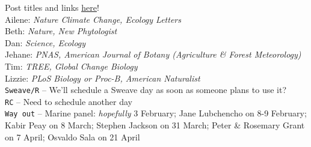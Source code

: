 \documentclass[11pt]{article}
\newenvironment{smitemize}{
\begin{itemize}
  \setlength{\itemsep}{0pt}
  \setlength{\parskip}{0.8pt}
  \setlength{\parsep}{0pt}}
{\end{itemize}
}
\begin{document}
 Post titles and links \href{https://docs.google.com/document/d/1j0WdDbjdp8ERLSO7whvtnP-tOblYMlX33TSCXy_uRKo/edit?usp=sharing}{\underline{here}}!\\
Ailene: \emph{Nature Climate Change, Ecology Letters}\\
Beth: \emph{Nature, New Phytologist}\\
Dan: \emph{Science, Ecology}\\
Jehane: \emph{PNAS, American Journal of Botany (Agriculture \& Forest Meteorology)}\\
Tim: \emph{TREE, Global Change Biology}\\
Lizzie: \emph{PLoS Biology or Proc-B, American Naturalist}\\
\vspace{6pt}
 \verb|Sweave/R| -- We'll schedule a Sweave day as soon as someone
 plans to use it?\\
\verb|RC| -- Need to schedule another day\\
\verb|Way out| -- Marine panel: \emph{hopefully} 3 February;  Jane
Lubchencho on 8-9 February; Kabir Peay on 8 March; Stephen Jackson on
31 March; Peter \& Rosemary Grant on 7 April; Osvaldo Sala on 21 April\\

\vspace{2ex}

\iffalse
\noindent {\bf HUH seminars not to miss:}
\begin{smitemize}
\item 7 April: Elizabeth Farnsworth
\item 14 April: Brian Anacker
\end{smitemize}
\fi
\end{document}
